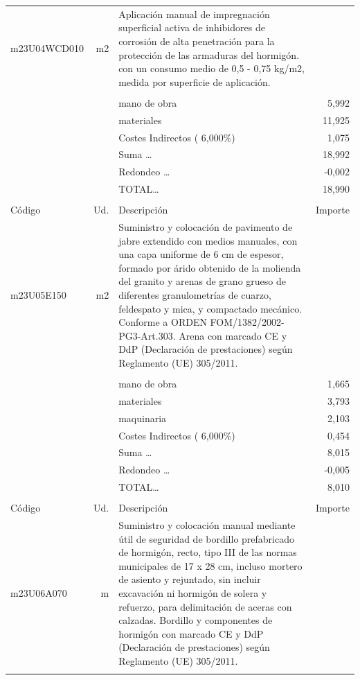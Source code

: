 \documentclass{book}%
\begin{document}
\begin{supertabular}{l r p{60mm} r}
\hline%
m23U04WCD010&m2&Aplicación manual de impregnación superficial activa de inhibidores de corrosión de alta penetración para la protección de las armaduras del hormigón. con un consumo medio de 0,5 {-} 0,75 kg/m2, medida por superficie de aplicación.&\\%
&&&\\%
&&mano de obra&     5,992\\%
&&materiales&    11,925\\%
&&Costes Indirectos (     6,000\%)&     1,075\\%
&&Suma \ldots&    18,992\\%
&&Redondeo \ldots&    {-}0,002\\%
%
&&TOTAL\ldots&    18,990\\%
&&&\\%
Código&Ud.&Descripción&Importe\\%
\hline%
m23U05E150&m2&Suministro y colocación de pavimento de jabre extendido con medios manuales, con una capa uniforme de 6 cm de espesor, formado por árido obtenido de la molienda del granito y arenas de grano grueso de diferentes granulometrías de cuarzo, feldespato y mica, y compactado mecánico. Conforme a ORDEN FOM/1382/2002{-}PG3{-}Art.303. Arena con marcado CE y DdP (Declaración de prestaciones) según Reglamento (UE) 305/2011.&\\%
&&&\\%
&&mano de obra&     1,665\\%
&&materiales&     3,793\\%
&&maquinaria&     2,103\\%
&&Costes Indirectos (     6,000\%)&     0,454\\%
&&Suma \ldots&     8,015\\%
&&Redondeo \ldots&    {-}0,005\\%
%
&&TOTAL\ldots&     8,010\\%
&&&\\%
Código&Ud.&Descripción&Importe\\%
\hline%
m23U06A070&m&Suministro y colocación manual mediante útil de seguridad de bordillo prefabricado de hormigón, recto, tipo III de las normas municipales de 17 x 28 cm, incluso mortero de asiento y rejuntado, sin incluir excavación ni hormigón de solera y refuerzo, para delimitación de aceras con calzadas. Bordillo y componentes de hormigón con marcado CE y DdP (Declaración de prestaciones) según Reglamento (UE) 305/2011.&\\%
&&&\\%

\end{supertabular}
\end{document}
